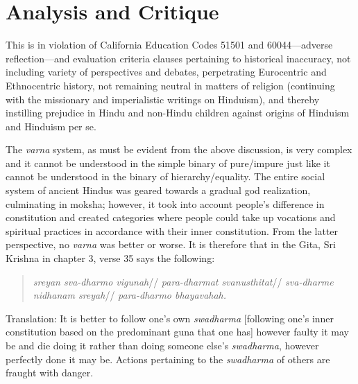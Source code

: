 \section*{Analysis and Critique} 

This is in violation of California Education Codes 51501 and 60044—adverse reflection—and evaluation criteria clauses pertaining to historical inaccuracy, not including variety of perspectives and debates, perpetrating Eurocentric and Ethnocentric history, not remaining neutral in matters of religion (continuing with the missionary and imperialistic writings on Hinduism), and thereby instilling prejudice in Hindu and non-Hindu children against origins of Hinduism and Hinduism per se.

The \textit{varna} system, as must be evident from the above discussion, is very complex and it cannot be understood in the simple binary of pure/impure just like it cannot be understood in the binary of hierarchy/equality. The entire social system of ancient Hindus was geared towards a gradual god realization, culminating in moksha; however, it took into account people’s difference in constitution and created categories where people could take up vocations and spiritual practices in accordance with their inner constitution. From the latter perspective, no \textit{varna} was better or worse. It is therefore that in the Gita, Sri Krishna in chapter 3, verse 35 says the following: 

\begin{quote}
\textit{sreyan sva-dharmo vigunah}//
\textit{para-dharmat svanusthitat}//
\textit{sva-dharme nidhanam sreyah}//
\textit{para-dharmo bhayavahah.} 
\end{quote}

Translation: It is better to follow one’s own \textit{swadharma}  [following one’s inner constitution based on the predominant guna that one has] however faulty it may be and die doing it rather than doing someone else’s \textit{swadharma}, however perfectly done it may be. Actions pertaining to the \textit{swadharma} of others are fraught with danger. 

